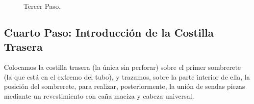 \begin{figure}[!htb]
\centering
{}
\caption{Tercer Paso. \label{fig:ter}}
\end{figure}

\pagebreak
\subsection{Cuarto Paso: Introducción de la Costilla Trasera}
Colocamos la costilla trasera (la única sin perforar) sobre el primer sombrerete (la que está en el extremo del tubo), y trazamos, sobre la parte interior de ella, la posición del sombrerete, para realizar, posteriormente, la unión de sendas piezas mediante un revestimiento con caña maciza y cabeza universal.

